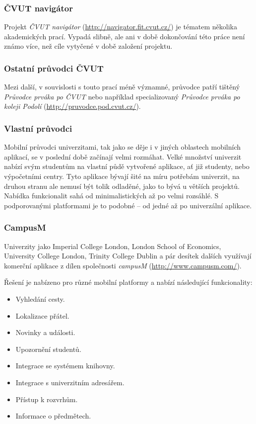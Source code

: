 \subsubsection{ČVUT navigátor}
Projekt \emph{ČVUT navigátor} (\url{http://navigator.fit.cvut.cz/}) je tématem několika akademických prací. Vypadá slibně, ale ani v době dokončování této práce není známo více, než cíle vytyčené v době založení projektu.

\subsubsection{Ostatní průvodci ČVUT}
Mezi další, v souvislosti s touto prací méně významné, průvodce patří tištěný \emph{Průvodce prváka po ČVUT} \cite{PruvodcePrvaka} nebo například specializovaný \emph{Průvodce prváka po koleji Podolí} (\url{http://pruvodce.pod.cvut.cz/}).

\subsubsection{Vlastní průvodci}
Mobilní průvodci univerzitami, tak jako se děje i v jiných oblastech mobilních aplikací, se v poslední době začínají velmi rozmáhat. Velké množství univerzit nabízí svým studentům na vlastní půdě vytvořené aplikace, ať již studenty, nebo výpočetními centry. Tyto aplikace bývají šité na míru potřebám univerzit, na druhou stranu ale nemusí být tolik odladěné, jako to bývá u větších projektů. Nabídka funkcionalit sahá od minimalistických až po velmi rozsáhlé. S podporovanými platformami je to podobné -- od jedné až po univerzální aplikace.

\subsubsection{CampusM}
Univerzity jako Imperial College London, London School of Economics, University College London, Trinity College Dublin a pár desítek dalších využívají komerční aplikace z dílen společnosti \emph{campusM} (\url{http://www.campusm.com/}).

Řešení je nabízeno pro různé mobilní platformy a nabízí následující funkcionality:
\begin{itemize}
\item Vyhledání cesty.
\item Lokalizace přátel.
\item Novinky a události.
\item Upozornění studentů.
\item Integrace se systémem knihovny.
\item Integrace s univerzitním adresářem.
\item Přístup k rozvrhům.
\item Informace o předmětech.
\end{itemize}


